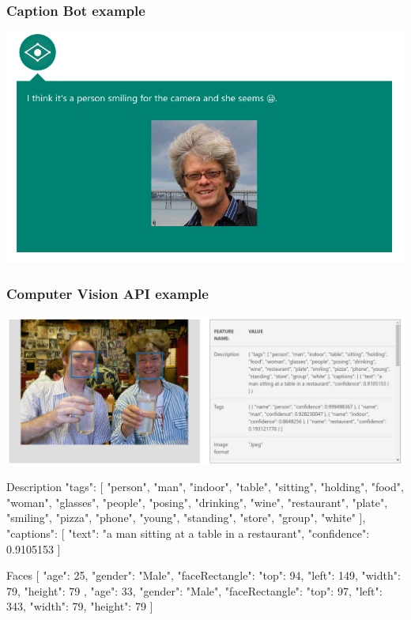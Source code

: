 \documentclass[xcolor=dvipsnames]{beamer}
\begin{document}
		\begin{frame}
			\frametitle{Caption Bot example}
			\begin{center}
				\includegraphics[width=\textwidth]{images/caption_detmar.png}
			\end{center}
		\end{frame}
		
		\begin{frame}
			\frametitle{Computer Vision API example}
			\begin{center}
				\includegraphics[width=\textwidth]{images/detmar_api.png}
			\end{center}
			\begin{itemize}
				\footnotesize{
					\item Description	{ "tags": [ "person", "man", "indoor", "table", "sitting", "holding", "food", "woman", "glasses", "people", "posing", "drinking", "wine", "restaurant", "plate", "smiling", "pizza", "phone", "young", "standing", "store", "group", "white" ], "captions": [ { "text": "a man sitting at a table in a restaurant", "confidence": 0.9105153 } ] }
					\item Faces	[ { "age": 25, "gender": "Male", "faceRectangle": { "top": 94, "left": 149, "width": 79, "height": 79 } }, { "age": 33, "gender": "Male", "faceRectangle": { "top": 97, "left": 343, "width": 79, "height": 79 } } ]
				}
			\end{itemize}
		\end{frame}
	
\end{document}
